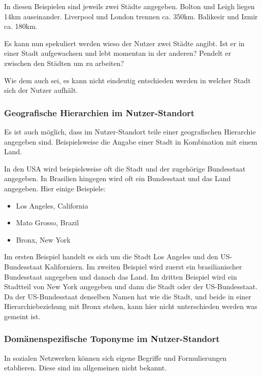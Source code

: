 				In diesen Beispielen sind jeweils zwei Städte angegeben.
				Bolton und Leigh liegen 14km auseinander.
				Liverpool und London trennen ca. 350km.
				Balikesir und Izmir ca. 180km.

				Es kann nun spekuliert werden wieso der Nutzer zwei Städte angibt.
				Ist er in einer Stadt aufgewachsen und lebt momentan in der anderen?
				Pendelt er zwischen den Städten um zu arbeiten?

				Wie dem auch sei, es kann nicht eindeutig entschieden werden in welcher Stadt sich der Nutzer aufhält.

			\subsubsection*{Geografische Hierarchien im Nutzer-Standort}

				Es ist auch möglich, dass im Nutzer-Standort teile einer geografischen Hierarchie angegeben sind.
				Beispielsweise die Angabe einer Stadt in Kombination mit einem Land.
				
				In den USA wird beispielsweise oft die Stadt und der zugehörige Bundesstaat angegeben.
				In Brasilien hingegen wird oft ein Bundesstaat und das Land angegeben.
				Hier einige Beispiele:

				\begin{itemize}
					\item Los Angeles, California
					\item Mato Grosso, Brazil
					\item Bronx, New York	
				\end{itemize}		

				Im ersten Beispiel handelt es sich um die Stadt Los Angeles und den US-Bundesstaat Kaliforniern.
				Im zweiten Beispiel wird zuerst ein brasilianischer Bundesstaat angegeben und danach das Land.
				Im dritten Beispiel wird ein Stadtteil von New York angegeben und dann die Stadt oder der US-Bundesstaat. 
				Da der US-Bundesstaat denselben Namen hat wie die Stadt, und beide in einer Hierarchiebeziehung mit Bronx stehen, kann hier nicht unterschieden werden was gemeint ist.
				
			\subsubsection{Domänenspezifische Toponyme im Nutzer-Standort} 

				In sozialen Netzwerken können sich eigene Begriffe und Formulierungen etablieren. 
				Diese sind im allgemeinen nicht bekannt.

